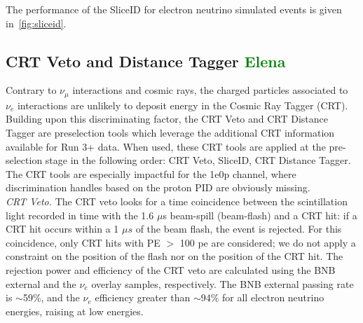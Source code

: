 The performance of the SliceID for electron neutrino simulated events is given in~\cref{fig:sliceid}.

\subsection{CRT Veto and Distance Tagger \textcolor{green}{Elena}}
\label{sec:sliceID:CRT}
Contrary to  $\nu_\mu$ interactions and cosmic rays, the charged particles associated to $\nu_e$ interactions are unlikely to deposit energy in the Cosmic Ray Tagger (CRT). Building upon this discriminating factor, the CRT Veto and CRT Distance Tagger are preselection tools which leverage the additional CRT information available for Run 3+ data.
When used, these CRT tools are applied at the pre-selection stage in the following order: CRT Veto, SliceID, CRT Distance Tagger. The CRT tools are especially impactful for the 1e0p channel, where discrimination handles based on the proton PID are obviously missing. \\


\emph{CRT Veto.} %
The CRT veto looks for a time coincidence between the scintillation light recorded in time with the 1.6 $\mu$s beam-spill (beam-flash) and a CRT hit: if a CRT hit occurs within a 1 $\mu s$ of the beam flash, the event is rejected. For this coincidence, only CRT hits with PE $>$ 100 pe are considered; we do not apply a constraint on the position of the flash nor on the position of the CRT hit. 
The rejection power and efficiency of the CRT veto are calculated using the BNB external and the $\nu_e$ overlay samples, respectively. The BNB external passing rate is $\sim$59\%,  and the $\nu_e$ efficiency greater than $\sim$94\% for all electron neutrino energies, raising at low energies. \\


